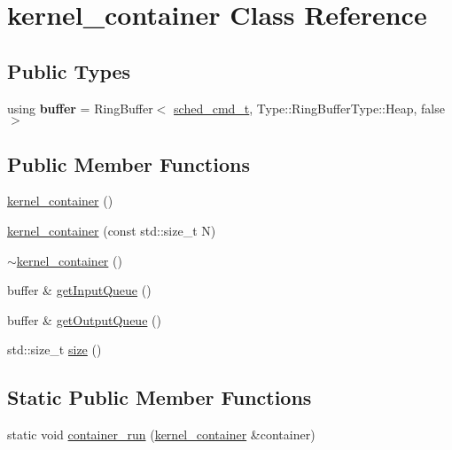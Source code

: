 \hypertarget{classkernel__container}{}\section{kernel\+\_\+container Class Reference}
\label{classkernel__container}
\subsection*{Public Types}
\begin{DoxyCompactItemize}
\item 
\hypertarget{classkernel__container_aaa8403088c93fca461e37158069d91b5}{}using {\bfseries buffer} = Ring\+Buffer$<$ \hyperlink{structsched__cmd__t}{sched\+\_\+cmd\+\_\+t}, Type\+::\+Ring\+Buffer\+Type\+::\+Heap, false $>$\label{classkernel__container_aaa8403088c93fca461e37158069d91b5}

\end{DoxyCompactItemize}
\subsection*{Public Member Functions}
\begin{DoxyCompactItemize}
\item 
\hyperlink{classkernel__container_a273d59eff9b9e269f1f9b231abc37b83}{kernel\+\_\+container} ()
\item 
\hyperlink{classkernel__container_a6d97cddd3d2f015166485afad9c71ff5}{kernel\+\_\+container} (const std\+::size\+\_\+t N)
\item 
\hyperlink{classkernel__container_acec164e3f4c6f37f4791c90c24514b34}{$\sim$kernel\+\_\+container} ()
\item 
buffer \& \hyperlink{classkernel__container_abcbec3854917b37bd6421b6b8ed2c2c0}{get\+Input\+Queue} ()
\item 
buffer \& \hyperlink{classkernel__container_a64384e258fee9b664d164eb50baf33df}{get\+Output\+Queue} ()
\item 
std\+::size\+\_\+t \hyperlink{classkernel__container_a358a15b772f1b7dfa57bd733fc78fcaa}{size} ()
\end{DoxyCompactItemize}
\subsection*{Static Public Member Functions}
\begin{DoxyCompactItemize}
\item 
static void \hyperlink{classkernel__container_a89f9b11119d9ab0e8c64215bf50856f0}{container\+\_\+run} (\hyperlink{classkernel__container}{kernel\+\_\+container} \&container)
\end{DoxyCompactItemize}


